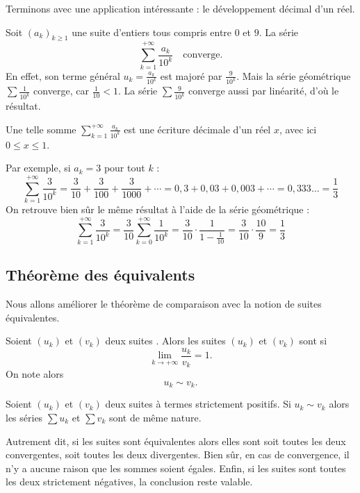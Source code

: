 \documentclass[class=report,crop=false]{standalone}
\begin{document}
Terminons avec une application intéressante : le développement décimal d'un réel.
\begin{exemple}
Soit $(a_k)_{k\ge 1}$ une suite d'entiers tous compris entre $0$ et $9$. La série
$$
\sum_{k=1}^{+\infty} \frac{a_k}{10^k}
\quad\text{converge.}
$$
En effet, son terme général $u_k=\frac{a_k}{10^k}$ est majoré par $\frac{9}{10^k}$. 
Mais la série géométrique $\sum \frac{1}{10^k}$ converge, car $\frac{1}{10}<1$. La série 
$\sum \frac{9}{10^k}$ converge aussi par linéarité, d'où le résultat.

Une telle somme $\sum_{k=1}^{+\infty} \frac{a_k}{10^k}$ est une écriture décimale d'un réel
$x$, avec ici $0 \le x \le 1$.

Par exemple, si $a_k = 3$ pour tout $k$ : 
$$\sum_{k=1}^{+\infty} \frac{3}{10^k} 
= \frac{3}{10}+\frac{3}{100}+\frac{3}{1000}+\cdots
= 0,3+0,03+0,003+\cdots = 0,333\ldots = \frac13$$
On retrouve bien sûr le même résultat à l'aide de la série géométrique :
$$\sum_{k=1}^{+\infty} \frac{3}{10^k} 
= \frac{3}{10} \sum_{k=0}^{+\infty} \frac{1}{10^k}
=  \frac{3}{10} \cdot \frac{1}{1-\frac{1}{10}}
=  \frac{3}{10} \cdot \frac{10}{9}
= \frac13$$
\end{exemple}



\subsection{Théorème des équivalents}

Nous allons améliorer le théorème de comparaison avec la notion de suites équivalentes.


Soient $(u_k)$ et $(v_k)$ deux suites . Alors les suites
$(u_k)$ et $(v_k)$ sont  si 
$$\lim_{k\to+\infty} \frac{u_k}{v_k}=1.$$
On note alors $$u_k \sim v_k.$$


\begin{theoreme}
\label{th:equivalentseries}
Soient $(u_k)$ et $(v_k)$ deux suites à termes strictement positifs.
Si $u_k \sim v_k$ alors les séries $\sum u_k$ et $\sum v_k$ sont de même nature.
\end{theoreme}

Autrement dit, si les suites sont équivalentes alors elles sont soit toutes les deux convergentes,
soit toutes les deux divergentes. Bien sûr, en cas de convergence, il n'y a aucune 
raison que les sommes soient égales. Enfin, si les suites sont toutes les deux strictement négatives, la
conclusion reste valable.
\end{document}

